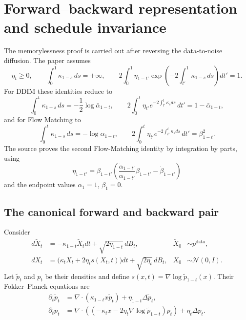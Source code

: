 \section{Forward--backward representation and schedule invariance}

The memorylessness proof is carried out after reversing the data-to-noise diffusion.  The paper assumes
\begin{equation*}
 \eta_t\ge 0,
 \qquad
 \int_0^1\kappa_{1-s}\,ds=+\infty,
 \qquad
 2\int_0^1\eta_{1-t'}
 \exp\left(-2\int_{t'}^1\kappa_{1-s}\,ds\right)dt'=1.
 \tag{50}
\end{equation*}
For DDIM these identities reduce to
\begin{equation*}
 \int_0^t\kappa_{1-s}\,ds=-\frac12\log\bar\alpha_{1-t},
 \qquad
 2\int_0^t\eta_{t'}e^{-2\int_{t'}^t\kappa_sds}\,dt'=1-\bar\alpha_{1-t},
 \tag{51}
\end{equation*}
and for Flow Matching to
\begin{equation*}
 \int_0^t\kappa_{1-s}\,ds=-\log\alpha_{1-t},
 \qquad
 2\int_0^t\eta_{t'}e^{-2\int_{t'}^t\kappa_sds}\,dt'=\beta_{1-t}^2.
 \tag{52--53}
\end{equation*}
The source proves the second Flow-Matching identity by integration by parts, using
\[
 \eta_{1-t'}=\beta_{1-t'}
 \left(\frac{\dot\alpha_{1-t'}}{\alpha_{1-t'}}\beta_{1-t'}-\dot\beta_{1-t'}\right)
\]
and the endpoint values $\alpha_1=1$, $\beta_1=0$.

\subsection{The canonical forward and backward pair}
Consider
\begin{align*}
 d\widetilde X_t&=-\kappa_{1-t}\widetilde X_tdt+\sqrt{2\eta_{1-t}}\,dB_t,
 &\widetilde X_0&\sim p^{\mathrm{data}},
 \tag{54}\\
 dX_t&=\bigl(\kappa_tX_t+2\eta_ts(X_t,t)\bigr)dt+\sqrt{2\eta_t}\,dB_t,
 &X_0&\sim\mathcal N(0,I).
 \tag{55}
\end{align*}
Let $\widetilde p_t$ and $p_t$ be their densities and define
$s(x,t)=\nabla\log\widetilde p_{1-t}(x)$.  Their Fokker--Planck equations are
\begin{align*}
 \partial_t\widetilde p_t
 &=\nabla\cdot(\kappa_{1-t}x\widetilde p_t)+\eta_{1-t}\Delta\widetilde p_t,
 \tag{56}\\
 \partial_tp_t
 &=\nabla\cdot\left((-\kappa_tx-2\eta_t\nabla\log\widetilde p_{1-t})p_t\right)
 +\eta_t\Delta p_t.
 \tag{57}
\end{align*}

